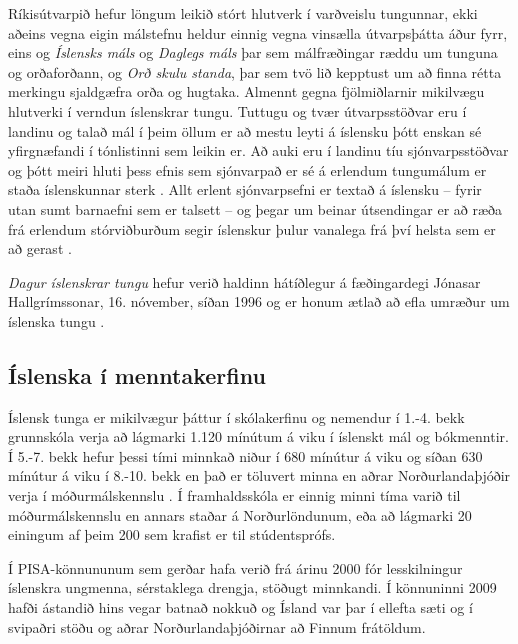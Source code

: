 \documentclass{../../metanetpaper}
\begin{document}
\begin{multicols}{2}
Ríkisútvarpið hefur löngum leikið stórt hlutverk í varðveislu tungunnar, ekki aðeins vegna eigin málstefnu heldur einnig vegna vinsælla útvarpsþátta áður fyrr, eins og \textit{Íslensks máls} og \textit{Daglegs máls} þar sem málfræðingar ræddu um tunguna og orðaforðann, og \textit{Orð skulu standa}, þar sem tvö lið kepptust um að finna rétta merkingu sjaldgæfra orða og hugtaka. Almennt gegna fjölmiðlarnir mikilvægu hlutverki í verndun íslenskrar tungu. Tuttugu og tvær útvarpsstöðvar eru í landinu og talað mál í þeim öllum er að mestu leyti á íslensku þótt enskan sé yfirgnæfandi í tónlistinni sem leikin er. Að auki eru í landinu tíu sjónvarpsstöðvar og þótt meiri hluti þess efnis sem sjónvarpað er sé á erlendum tungumálum er staða íslenskunnar sterk \cite{hag2}. Allt erlent sjónvarpsefni er textað á íslensku -- fyrir utan sumt barnaefni sem er talsett -- og þegar um beinar útsendingar er að ræða frá erlendum stórviðburðum segir íslenskur þulur vanalega frá því helsta sem er að gerast \cite{alt3}.

\textit{Dagur íslenskrar tungu} hefur verið haldinn hátíðlegur á fæðingardegi Jónasar Hallgrímssonar, 16. nóvember, síðan 1996 og er honum ætlað að efla umræður um íslenska tungu \cite{men1}.

\subsection{Íslenska í menntakerfinu}

Íslensk tunga er mikilvægur þáttur í skólakerfinu og nemendur í 1.-4. bekk grunnskóla verja að lágmarki 1.120 mínútum á viku í íslenskt mál og bókmenntir. Í 5.-7. bekk hefur þessi tími minnkað niður í 680 mínútur á viku og síðan 630 mínútur á viku í 8.-10. bekk en það er töluvert minna en aðrar Norðurlandaþjóðir verja í móðurmálskennslu \cite{men2}. Í framhaldsskóla er einnig minni tíma varið til móðurmálskennslu en annars staðar á Norðurlöndunum, eða að lágmarki 20 einingum af þeim 200 sem krafist er til stúdentsprófs\cite{men3}. 

Í PISA-könnununum sem gerðar hafa verið frá árinu 2000 fór lesskilningur íslenskra ungmenna, sérstaklega drengja, stöðugt minnkandi. Í könnuninni 2009 hafði ástandið hins vegar batnað nokkuð og Ísland var þar í ellefta sæti og í svipaðri stöðu og aðrar Norðurlandaþjóðirnar að Finnum frátöldum\cite{nam1}.


\end{multicols}
\end{document}
